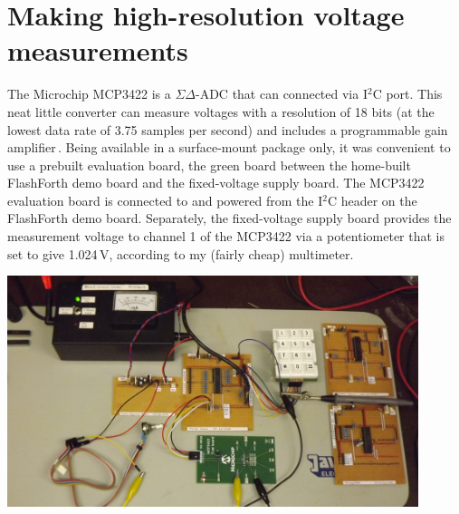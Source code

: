 \documentclass[12pt,a4paper]{article}
\newcommand{\code}[2]{
 \hrulefill
 \scriptsize
 
 \hrulefill
 \vspace{2em}
 \normalsize
}
\begin{document}
\section{Making high-resolution voltage measurements}
%
The Microchip MCP3422 is a $\Sigma \Delta$-ADC that can connected via I$^2$C port.
This neat little converter can measure voltages with a resolution of 18 bits 
(at the lowest data rate of 3.75 samples per second) and includes
a programmable gain amplifier\,\cite{mcp3422-datasheet}.
Being available in a surface-mount package only, it was convenient to use a prebuilt
evaluation board, the green board between the home-built FlashForth demo board 
and the fixed-voltage supply board.
The MCP3422 evaluation board is connected to and powered from the I$^2$C header on the
FlashForth demo board.  
Separately, the fixed-voltage supply board provides the measurement voltage 
to channel 1 of the MCP3422 via a potentiometer that is set to give 1.024\,V, 
according to my (fairly cheap) multimeter.

\medskip
\centerline{
\includegraphics[width=0.9\textwidth]{../figs/mcp3422-i2c-demo-with-pic18f26k22.jpeg}
}

\bigskip\noindent
\code{}{../pic18/mcp3422-2016.txt}

\medskip\noindent
\end{document}
